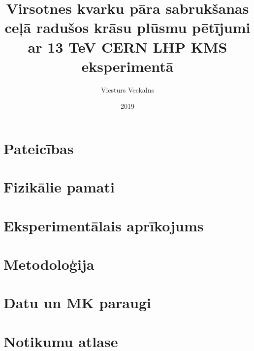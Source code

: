 \documentclass[titlepage, a4paper, LV, SHORT]{mythesis}
\title{Virsotnes kvarku pāra sabrukšanas ceļā radušos krāsu plūsmu pētījumi ar 13 TeV CERN LHP KMS eksperimentā}
\author{Viesturs Veckalns}
\date{2019}
\begin{document}
\maketitle
\begin{abstract}
        
\end{abstract}

\chapter*{Pateicības}
\label{chap:acknowledgements}


\tableofcontents
\printglossary[toctitle=Latviešu\textendash angļu terminu rādītājs, title=Latviešu\textendash angļu terminu rādītājs]
{}
\label{chap:introduction}


\chapter{Fizikālie pamati}


\chapter{Eksperimentālais aprīkojums}


\chapter{Metodoloģija}
\label{chap:methodology}


\chapter{Datu un MK paraugi}


\chapter{Notikumu atlase}
\label{chap:event_selection}

\end{document}

